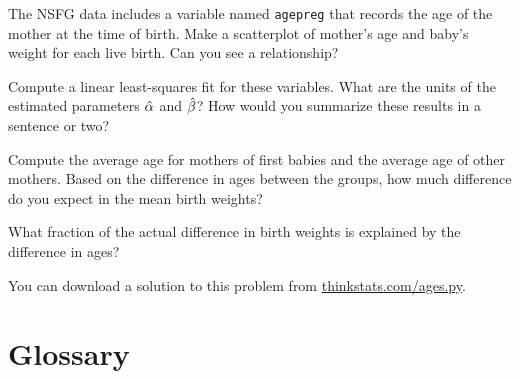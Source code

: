 \documentclass[12pt]{book}
\begin{document}
\begin{ex}

The NSFG data includes a variable named {\tt agepreg} that records
the age of the mother at the time of birth.
Make a scatterplot of mother's age and baby's weight for each live
birth.  Can you see a relationship?

Compute a linear least-squares fit for these variables.  What are the
units of the estimated parameters $\hat{\alpha}$ and $\hat{\beta}$?
How would you summarize these results in a sentence or two?

Compute the average age for mothers of first babies and the average
age of other mothers.  Based on the difference in ages between the
groups, how much difference do you expect in the mean birth weights?

What fraction of the actual difference in birth weights is explained
by the difference in ages?

You can download a solution to this problem from
\url{thinkstats.com/ages.py}.

\end{ex}






\section{Glossary}
\end{document}
